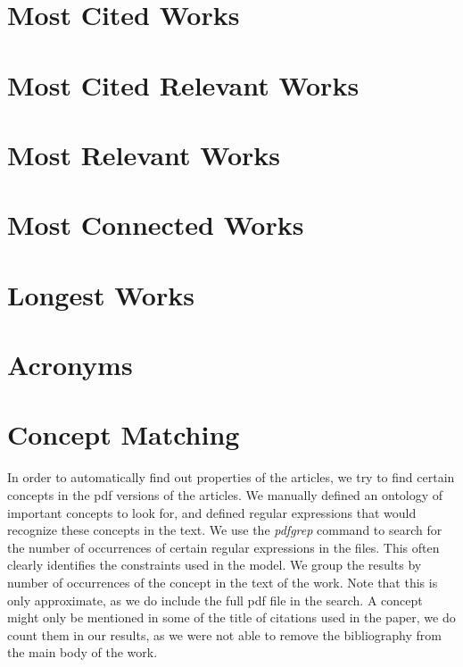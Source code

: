 \documentclass[a4paper]{article}
\begin{document}


\clearpage
\section{Most Cited Works}



\clearpage
\section{Most Cited Relevant Works}



\clearpage
\section{Most Relevant Works}



\clearpage
\section{Most Connected Works}



\clearpage
\section{Longest Works}



\clearpage
\section{Acronyms}



\clearpage
\section{Concept Matching}

In order to automatically find out properties of the articles, we try to find certain concepts in the pdf versions of the articles. We manually defined an ontology of important concepts to look for, and defined regular expressions that would recognize these concepts in the text. We use the \emph{pdfgrep} command to search for the number of occurrences of certain regular expressions in the files. This often clearly identifies the constraints used in the model. We group the results by number of occurrences of the concept in the text of the work. Note that this is only approximate, as we do include the full pdf file in the search. A concept might only be mentioned in some of the title of citations used in the paper, we do count them in our results, as we were not able to remove the bibliography from the main body of the work.
\end{document}
